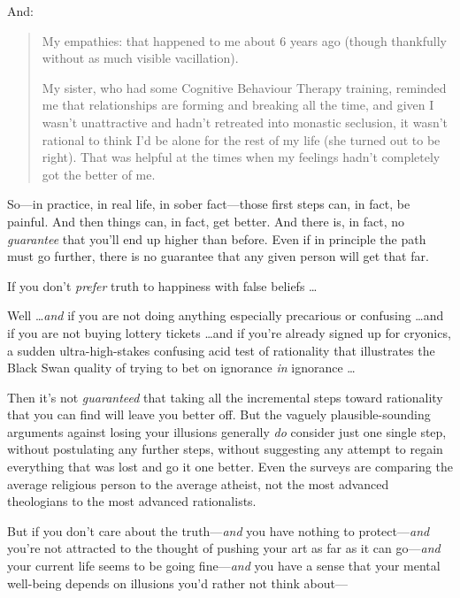 {
 And:}

\begin{quotation}
{
 My empathies: that happened to me about 6 years ago (though
thankfully without as much visible vacillation).}

{
 My sister, who had some Cognitive Behaviour Therapy training,
reminded me that relationships are forming and breaking all the time,
and given I wasn't unattractive and
hadn't retreated into monastic seclusion, it
wasn't rational to think I'd be alone
for the rest of my life (she turned out to be right). That was helpful
at the times when my feelings hadn't completely got the
better of me.}
\end{quotation}

{
 So---in practice, in real life, in sober fact---those first steps
can, in fact, be painful. And then things can, in fact, get better. And
there is, in fact, no \textit{guarantee} that you'll
end up higher than before. Even if in principle the path must go
further, there is no guarantee that any given person will get that
far.}

{
 If you don't \textit{prefer} truth to happiness
with false beliefs \ldots}

{
 Well \ldots \textit{and} if you are not doing anything especially
precarious or confusing \ldots and if you are not buying lottery tickets
\ldots and if you're already signed up for cryonics, a
sudden ultra-high-stakes confusing acid test of rationality that
illustrates the Black Swan quality of trying to bet on ignorance
\textit{in} ignorance \ldots}

{
 Then it's not \textit{guaranteed} that taking all
the incremental steps toward rationality that you can find will leave
you better off. But the vaguely plausible-sounding arguments against
losing your illusions generally \textit{do} consider just one single
step, without postulating any further steps, without suggesting any
attempt to regain everything that was lost and go it one better. Even
the surveys are comparing the average religious person to the average
atheist, not the most advanced theologians to the most advanced
rationalists.}

{
 But if you don't care about the
truth---\textit{and} you have nothing to protect---\textit{and}
you're not attracted to the thought of pushing your art
as far as it can go---\textit{and} your current life seems to be going
fine---\textit{and} you have a sense that your mental well-being
depends on illusions you'd rather not think about---}

